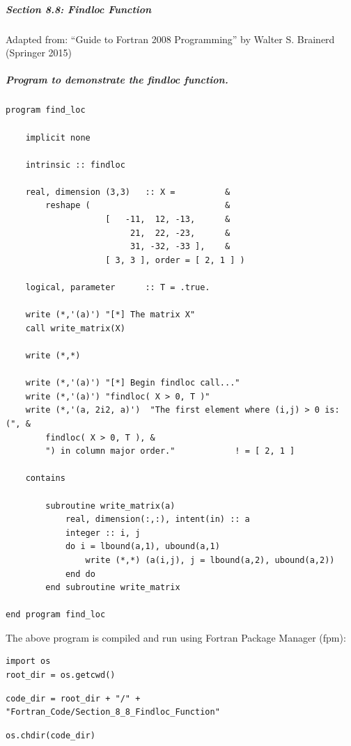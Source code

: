 \subparagraph{Section 8.8: Findloc Function}

Adapted from: ``Guide to Fortran 2008 Programming'' by Walter S. Brainerd (Springer 2015)

\subparagraph{Program to demonstrate the \textit{findloc} function.}

\begin{verbatim}
program find_loc

    implicit none

    intrinsic :: findloc

    real, dimension (3,3)   :: X =          &
        reshape (                           &
                    [   -11,  12, -13,      &
                         21,  22, -23,      &
                         31, -32, -33 ],    &
                    [ 3, 3 ], order = [ 2, 1 ] )

    logical, parameter      :: T = .true.

    write (*,'(a)') "[*] The matrix X"
    call write_matrix(X)

    write (*,*)

    write (*,'(a)') "[*] Begin findloc call..."
    write (*,'(a)') "findloc( X > 0, T )"
    write (*,'(a, 2i2, a)')  "The first element where (i,j) > 0 is: (", &
        findloc( X > 0, T ), &
        ") in column major order."            ! = [ 2, 1 ]

    contains

        subroutine write_matrix(a)
            real, dimension(:,:), intent(in) :: a
            integer :: i, j
            do i = lbound(a,1), ubound(a,1)
                write (*,*) (a(i,j), j = lbound(a,2), ubound(a,2))
            end do
        end subroutine write_matrix

end program find_loc
\end{verbatim}

The above program is compiled and run using Fortran Package Manager (fpm):

\begin{verbatim}
import os
root_dir = os.getcwd()
\end{verbatim}

\begin{verbatim}
code_dir = root_dir + "/" + "Fortran_Code/Section_8_8_Findloc_Function"
\end{verbatim}

\begin{verbatim}
os.chdir(code_dir)
\end{verbatim}

